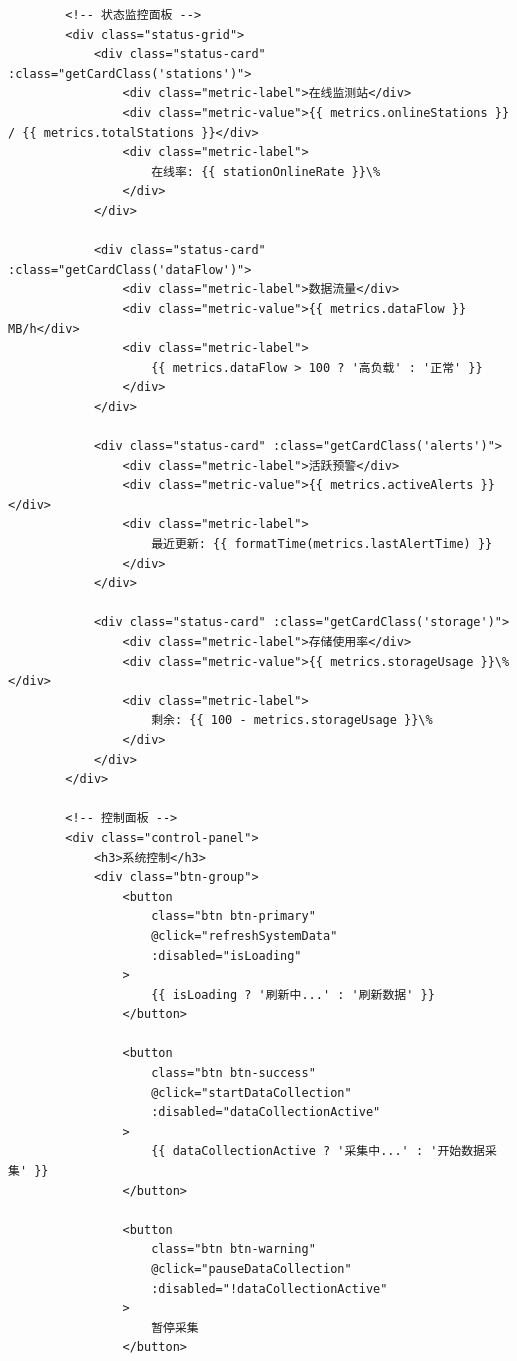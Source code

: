 {{\begin{verbatim}
        <!-- 状态监控面板 -->
        <div class="status-grid">
            <div class="status-card" :class="getCardClass('stations')">
                <div class="metric-label">在线监测站</div>
                <div class="metric-value">{{ metrics.onlineStations }} / {{ metrics.totalStations }}</div>
                <div class="metric-label">
                    在线率: {{ stationOnlineRate }}\%
                </div>
            </div>
            
            <div class="status-card" :class="getCardClass('dataFlow')">
                <div class="metric-label">数据流量</div>
                <div class="metric-value">{{ metrics.dataFlow }} MB/h</div>
                <div class="metric-label">
                    {{ metrics.dataFlow > 100 ? '高负载' : '正常' }}
                </div>
            </div>
            
            <div class="status-card" :class="getCardClass('alerts')">
                <div class="metric-label">活跃预警</div>
                <div class="metric-value">{{ metrics.activeAlerts }}</div>
                <div class="metric-label">
                    最近更新: {{ formatTime(metrics.lastAlertTime) }}
                </div>
            </div>
            
            <div class="status-card" :class="getCardClass('storage')">
                <div class="metric-label">存储使用率</div>
                <div class="metric-value">{{ metrics.storageUsage }}\%</div>
                <div class="metric-label">
                    剩余: {{ 100 - metrics.storageUsage }}\%
                </div>
            </div>
        </div>
        
        <!-- 控制面板 -->
        <div class="control-panel">
            <h3>系统控制</h3>
            <div class="btn-group">
                <button 
                    class="btn btn-primary" 
                    @click="refreshSystemData"
                    :disabled="isLoading"
                >
                    {{ isLoading ? '刷新中...' : '刷新数据' }}
                </button>
                
                <button 
                    class="btn btn-success" 
                    @click="startDataCollection"
                    :disabled="dataCollectionActive"
                >
                    {{ dataCollectionActive ? '采集中...' : '开始数据采集' }}
                </button>
                
                <button 
                    class="btn btn-warning" 
                    @click="pauseDataCollection"
                    :disabled="!dataCollectionActive"
                >
                    暂停采集
                </button>
                

\end{verbatim}}}
